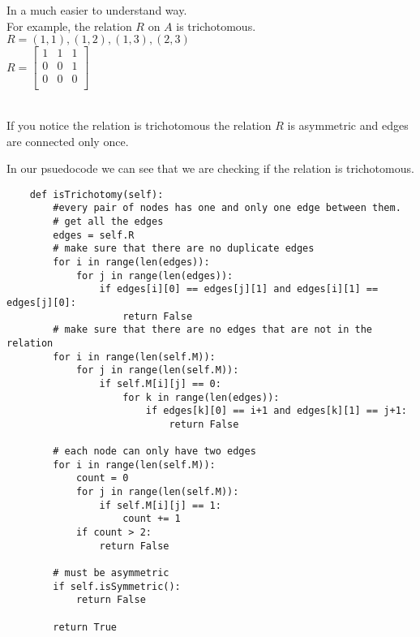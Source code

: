 In a much easier to understand way. \\
For example, the relation $R$ on $A$ is trichotomous. \\

$R = {(1,1),(1,2),(1,3),(2,3)}$ \\ 

$R = \begin{bmatrix}
    1 & 1 & 1 \\
    0 & 0 & 1 \\
    0 & 0 & 0 \\
\end{bmatrix}$ \\

 \\

If you notice the relation is trichotomous the relation $R$ is asymmetric and edges are connected only once.

In our psuedocode we can see that we are checking if the relation is trichotomous. \\
\begin{lstlisting}
    def isTrichotomy(self):
        #every pair of nodes has one and only one edge between them.        
        # get all the edges 
        edges = self.R
        # make sure that there are no duplicate edges
        for i in range(len(edges)):
            for j in range(len(edges)):
                if edges[i][0] == edges[j][1] and edges[i][1] == edges[j][0]:
                    return False
        # make sure that there are no edges that are not in the relation                    
        for i in range(len(self.M)):
            for j in range(len(self.M)):
                if self.M[i][j] == 0:
                    for k in range(len(edges)):
                        if edges[k][0] == i+1 and edges[k][1] == j+1:
                            return False
                
        # each node can only have two edges
        for i in range(len(self.M)):
            count = 0
            for j in range(len(self.M)):
                if self.M[i][j] == 1:
                    count += 1
            if count > 2:
                return False
                      
        # must be asymmetric
        if self.isSymmetric():
            return False
            
        return True
\end{lstlisting}



